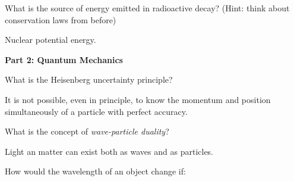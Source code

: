 \documentclass[12pt]{exam}
\begin{document}
\begin{questions}
	\question What is the source of energy emitted in radioactive decay? (Hint: think about conservation laws from before)
	\begin{TheSolution}
		Nuclear potential energy.
	\end{TheSolution}
	
	\clearpage
	\noindent\textbf{\Large Part 2: Quantum Mechanics}
	
	\question What is the Heisenberg uncertainty principle?
		\begin{TheSolution}
			It is not possible, even in principle, to know the momentum and position simultaneously of a particle with perfect accuracy.
		\end{TheSolution}
	\question What is the concept of \textit{wave-particle duality}?
		\begin{TheSolution}
			Light an matter can exist both as waves and as particles.
		\end{TheSolution}
		
	\question How would the wavelength of an object change if:
		

\end{questions}
\end{document}
